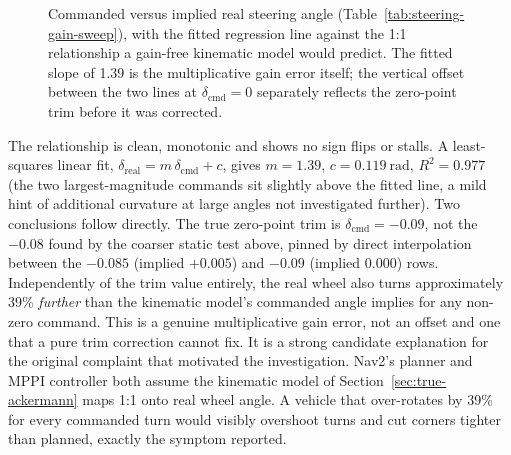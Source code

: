 \begin{figure}[htbp]
  \centering
  \caption[Commanded vs.\ implied real steering angle]{Commanded versus implied real steering angle
    (Table~\ref{tab:steering-gain-sweep}), with the fitted regression
    line against the 1:1 relationship a gain-free kinematic model
    would predict. The fitted slope of 1.39 is the multiplicative gain
    error itself; the vertical offset between the two lines at
    $\delta_{\text{cmd}}=0$ separately reflects the zero-point trim
    before it was corrected.}
  \label{fig:steering-gain-fit}
\end{figure}

The relationship is clean, monotonic and shows no sign flips or
stalls. A least-squares linear fit,
$\delta_{\text{real}} = m \, \delta_{\text{cmd}} + c$, gives
$m = 1.39$, $c = \SI{0.119}{\radian}$, $R^2 = 0.977$ (the two
largest-magnitude commands sit slightly above the fitted line, a mild
hint of additional curvature at large angles not investigated
further). Two conclusions follow directly. The true zero-point
trim is $\delta_{\text{cmd}} = -0.09$, not the $-0.08$ found by the
coarser static test above, pinned by direct interpolation between
the $-0.085$ (implied $+0.005$) and $-0.09$ (implied $0.000$) rows.
Independently of the trim value entirely, the real wheel
also turns approximately 39\% \emph{further} than the kinematic model's
commanded angle implies for any non-zero command. This is a genuine
multiplicative gain error, not an offset and one that a pure trim
correction cannot fix. It is a strong candidate explanation for the
original complaint that motivated the investigation. Nav2's planner
and MPPI controller both assume the kinematic model of
Section~\ref{sec:true-ackermann} maps 1:1 onto real wheel angle. A
vehicle that over-rotates by 39\% for every commanded turn would
visibly overshoot turns and cut corners tighter than planned,
exactly the symptom reported.

